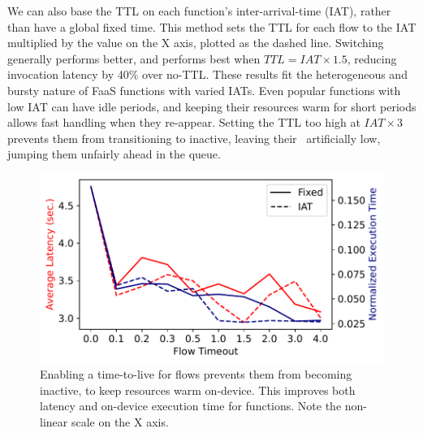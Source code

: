 We can also base the TTL on each function's inter-arrival-time (IAT), rather than have a global fixed time.
This method sets the TTL for each flow to the IAT multiplied by the value on the X axis, plotted as the dashed line.
Switching generally performs better, and performs best when $TTL = IAT \times 1.5$, reducing invocation latency by 40\% over no-TTL.
These results fit the heterogeneous and bursty nature of FaaS functions with varied IATs.
Even popular functions with low IAT can have idle periods, and keeping their resources warm for short periods allows fast handling when they re-appear.
Setting the TTL too high at $IAT \times 3$ prevents them from transitioning to inactive, leaving their \VT~artificially low, jumping them unfairly ahead in the queue.

\begin{figure}
  \centering
  \includegraphics{mqfq/graphs/ttl/25.8/mqfq-ttl-compare.pdf}
  \caption{Enabling a time-to-live for flows prevents them from becoming inactive, to keep resources warm on-device. 
    This improves both latency and on-device execution time for functions.
    Note the non-linear scale on the X axis.}
    \label{fig:flow-ttl}
\end{figure}


